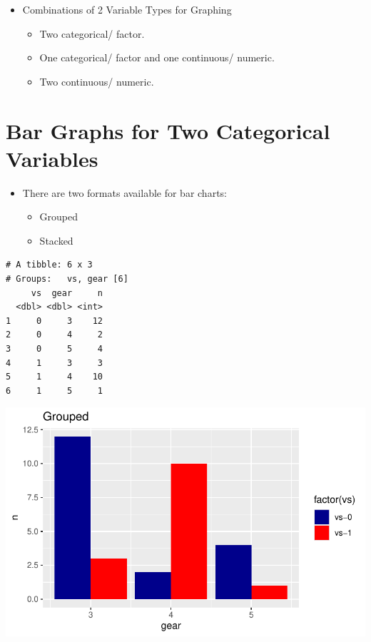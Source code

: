 \documentclass[
  letterpaper,
  DIV=11,
  numbers=noendperiod]{scrreprt}
\providecommand{\tightlist}{%
  \setlength{\itemsep}{0pt}\setlength{\parskip}{0pt}}\usepackage{longtable,booktabs,array}
\begin{document}
\begin{itemize}
\tightlist
\item
  Combinations of 2 Variable Types for Graphing

  \begin{itemize}
  \tightlist
  \item
    Two categorical/ factor.
  \item
    One categorical/ factor and one continuous/ numeric.
  \item
    Two continuous/ numeric.
  \end{itemize}
\end{itemize}

\section{Bar Graphs for Two Categorical
Variables}\label{bar-graphs-for-two-categorical-variables}

\begin{itemize}
\tightlist
\item
  There are two formats available for bar charts:

  \begin{itemize}
  \tightlist
  \item
    Grouped
  \item
    Stacked
  \end{itemize}
\end{itemize}

\begin{verbatim}
# A tibble: 6 x 3
# Groups:   vs, gear [6]
     vs  gear     n
  <dbl> <dbl> <int>
1     0     3    12
2     0     4     2
3     0     5     4
4     1     3     3
5     1     4    10
6     1     5     1
\end{verbatim}

\includegraphics{dataviz_files/figure-pdf/unnamed-chunk-35-1.pdf}
\end{document}
